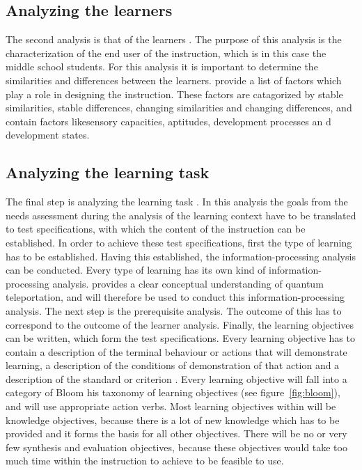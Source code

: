 \documentclass[12pt]{report} %
\begin{document}
\subsection{Analyzing the learners}

The second analysis is that of the learners \cite{smithragan}. The purpose of this analysis is the characterization of the end user of the instruction, which is in this case the middle school students. For this analysis it is important to determine the similarities and differences between the learners.  provide a list of factors which play a role in designing the instruction. These factors are catagorized by stable similarities, stable differences, changing similarities and changing differences, and contain factors likesensory capacities, aptitudes, development processes an d development states.

\subsection{Analyzing the learning task}

The final step is analyzing the learning task \cite{smithragan}. In this analysis the goals from the needs assessment during the analysis of the learning context have to be translated to test specifications, with which the content of the instruction can be established. In order to achieve these test specifications, first the type of learning has to be established. Having this established, the information-processing analysis can be conducted. Every type of learning has its own kind of information-processing analysis.  provides a clear conceptual understanding of quantum teleportation, and will therefore be used to conduct this information-processing analysis. The next step is the prerequisite analysis. The outcome of this has to correspond to the outcome of the learner analysis. Finally, the learning objectives can be written, which form the test specifications. Every learning objective has to contain a description of the terminal behaviour or actions that will demonstrate learning, a description of the conditions of demonstration of that action and a description of the standard or criterion \cite{smithragan}. Every learning objective will fall into a category of Bloom his taxonomy of learning objectives \cite{bloom} (see figure~\ref{fig:bloom}), and will use appropriate action verbs. Most learning objectives within will be knowledge objectives, because there is a lot of new knowledge which has to be provided and it forms the basis for all other objectives. There will be no or very few synthesis and evaluation objectives, because these objectives would take too much time within the instruction to achieve to be feasible to use.
\end{document}
